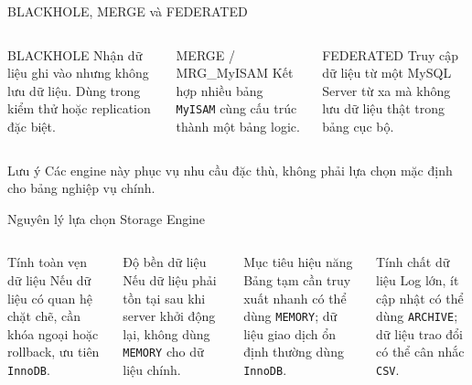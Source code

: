\documentclass[aspectratio=169,11pt]{beamer}
\newcommand{\code}[1]{\texttt{#1}}
\begin{document}
\begin{frame}{BLACKHOLE, MERGE và FEDERATED}
\begin{columns}[T,onlytextwidth]
\begin{block}{BLACKHOLE}
\small Nhận dữ liệu ghi vào nhưng không lưu dữ liệu. Dùng trong kiểm thử hoặc replication đặc biệt.
\end{block}
\begin{block}{MERGE / MRG\_MyISAM}
\small Kết hợp nhiều bảng \code{MyISAM} cùng cấu trúc thành một bảng logic.
\end{block}
\begin{block}{FEDERATED}
\small Truy cập dữ liệu từ một MySQL Server từ xa mà không lưu dữ liệu thật trong bảng cục bộ.
\end{block}
\end{columns}
\vspace{0.25cm}
\begin{alertblock}{Lưu ý}
Các engine này phục vụ nhu cầu đặc thù, không phải lựa chọn mặc định cho bảng nghiệp vụ chính.
\end{alertblock}
\end{frame}

\begin{frame}{Nguyên lý lựa chọn Storage Engine}
\begin{columns}[T,onlytextwidth]
\begin{block}{Tính toàn vẹn dữ liệu}
Nếu dữ liệu có quan hệ chặt chẽ, cần khóa ngoại hoặc rollback, ưu tiên \code{InnoDB}.
\end{block}
\begin{block}{Độ bền dữ liệu}
Nếu dữ liệu phải tồn tại sau khi server khởi động lại, không dùng \code{MEMORY} cho dữ liệu chính.
\end{block}
\begin{block}{Mục tiêu hiệu năng}
Bảng tạm cần truy xuất nhanh có thể dùng \code{MEMORY}; dữ liệu giao dịch ổn định thường dùng \code{InnoDB}.
\end{block}
\begin{block}{Tính chất dữ liệu}
Log lớn, ít cập nhật có thể dùng \code{ARCHIVE}; dữ liệu trao đổi có thể cân nhắc \code{CSV}.
\end{block}
\end{columns}
\end{frame}
\end{document}
